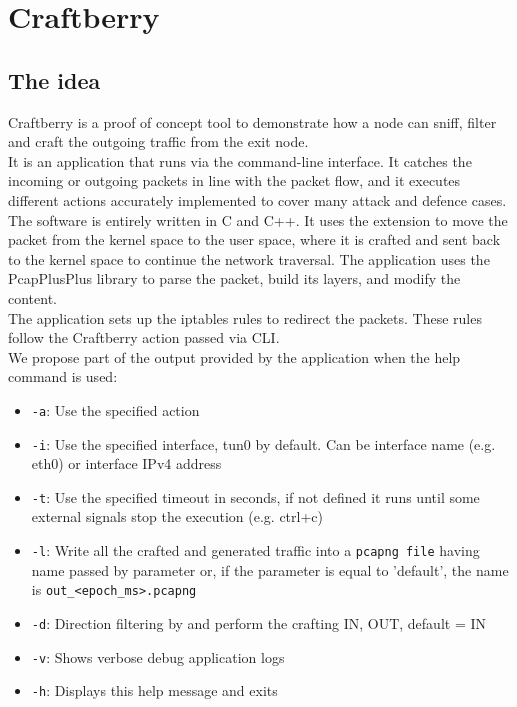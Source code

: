 \documentclass[12pt]{article}
\begin{document}
	\section{Craftberry}

	\subsection{The idea}
	Craftberry is a proof of concept tool to demonstrate how a node can sniff, filter and craft the outgoing traffic from the exit node.\\
	It is an application that runs via the command-line interface. It catches the incoming or outgoing packets in line with the packet flow, and it executes different actions accurately implemented to cover many attack and defence cases.\\
	The software is entirely written in C and C++. It uses the  extension to move the packet from the kernel space to the user space, where it is crafted and sent back to the kernel space to continue the network traversal. The application uses the PcapPlusPlus library to parse the packet, build its layers, and modify the content.\\
	The application sets up the iptables rules to redirect the packets. These rules follow the Craftberry action passed via CLI.\\
	
	We propose part of the output provided by the application when the help command is used:
	\begin{itemize}
		\item \lstinline{-a}: Use the specified action
		\item  \lstinline{-i}: Use the specified interface, tun0 by default. Can be interface name (e.g. eth0) or interface IPv4 address
		\item  \lstinline{-t}: Use the specified timeout in seconds, if not defined it runs until some external signals stop the execution (e.g. ctrl+c)
		\item  \lstinline{-l}: Write all the crafted and generated traffic into a \lstinline{pcapng file} having name passed by parameter or, if the parameter is equal to 'default', the name is \lstinline{out_<epoch_ms>.pcapng}
		\item  \lstinline{-d}: Direction filtering by and perform the crafting {IN, OUT}, default = IN
		\item  \lstinline{-v}: Shows verbose debug application logs
		\item  \lstinline{-h}: Displays this help message and exits
	\end{itemize}
		
\end{document}
